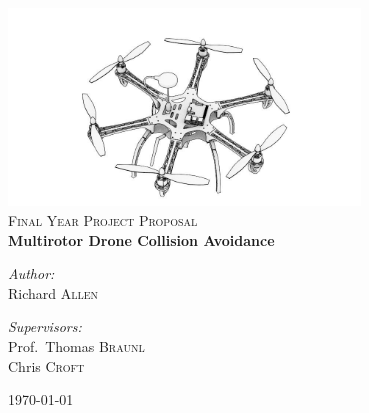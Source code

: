 \begin{titlepage}
    \begin{center}
        \includegraphics[width=0.7\textwidth]{./logo.jpg}~\\[1cm]
        \textsc{\Large Final Year Project Proposal}\\[0.5cm]
        { \huge \bfseries Multirotor Drone Collision Avoidance \\[0.4cm] }
        \noindent
        \begin{minipage}[t]{0.4\textwidth}
        \begin{flushleft} \large
        \emph{Author:}\\
        Richard \textsc{Allen}
        \end{flushleft}
        \end{minipage}%
        \begin{minipage}[t]{0.4\textwidth}
        \begin{flushright} \large
        \emph{Supervisors:} \\
        Prof.~Thomas \textsc{Braunl}\\
        Chris \textsc{Croft}
        \end{flushright}
        \end{minipage}
        \vfill
        {\large \today}
    \end{center}
\end{titlepage}


